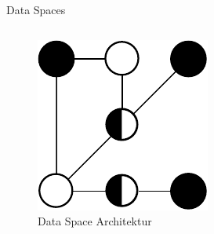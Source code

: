 \begin{frame}{Data Spaces \footnotesize\cite{mollerIndustrialDataEcosystems2024}}
\begin{columns}
        \begin{column}{0.4\textwidth}
            \begin{figure}
                \includegraphics[height=0.5\textheight]{./assets/data_space_architecture.drawio.pdf}
                \caption{Data Space Architektur}
            \end{figure}
        \end{column}
    \end{columns}
\end{frame}


